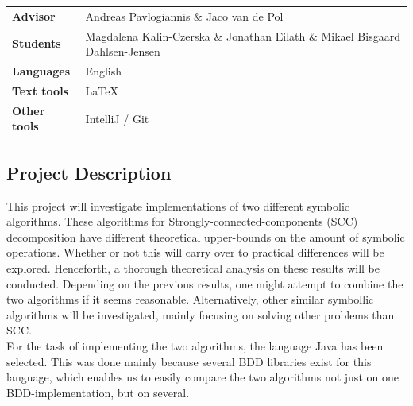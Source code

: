 \documentclass{article}
\begin{document}
\pagestyle{fancy}

\bgroup{}
\begin{table}[h]
\begin{tabular}{ll}
\textbf{Advisor}     & Andreas Pavlogiannis \& Jaco van de Pol               \\
\textbf{Students}    & Magdalena Kalin-Czerska \& Jonathan Eilath \& Mikael Bisgaard Dahlsen-Jensen   \\
\textbf{Languages}   & English \\
\textbf{Text tools}  & \LaTeX       \\
\textbf{Other tools} & IntelliJ  / Git       
\end{tabular}
\end{table}
\egroup\vspace{-0.cm}

\subsection*{Project Description}

This project will investigate implementations of two different symbolic algorithms. These algorithms for Strongly-connected-components (SCC) decomposition have different theoretical upper-bounds on the amount of symbolic operations. Whether or not this will carry over to practical differences will be explored. Henceforth, a thorough theoretical analysis on these results will be conducted. Depending on the previous results, one might attempt to combine the two algorithms if it seems reasonable. Alternatively, other similar symbollic algorithms will be investigated, mainly focusing on solving other problems than SCC. \\[2mm]

\noindent For the task of implementing the two algorithms, the language Java has been selected. This was done mainly because several BDD libraries exist for this language, which enables us to easily compare the two algorithms not just on one BDD-implementation, but on several. 
\end{document}
